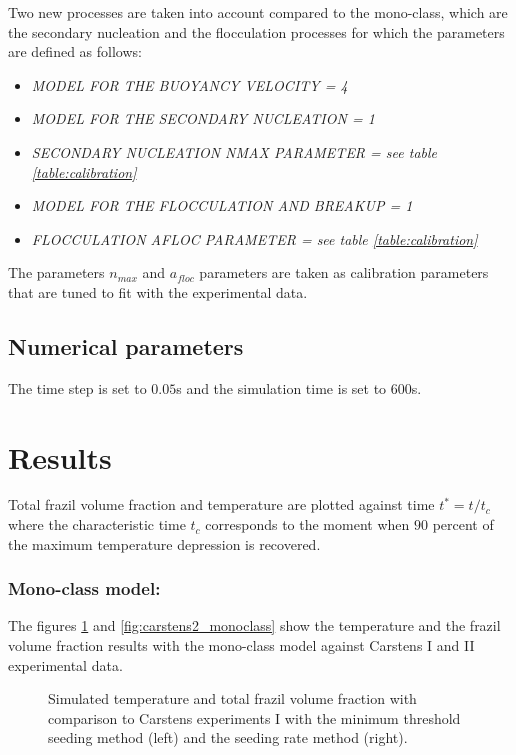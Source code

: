 Two new processes are taken into account compared to the mono-class, 
which are the secondary nucleation and the flocculation processes for which
the parameters are defined as follows:
\begin{itemize}
	\item\textit{MODEL FOR THE BUOYANCY VELOCITY = 4}
	\item\textit{MODEL FOR THE SECONDARY NUCLEATION = 1}
	\item\textit{SECONDARY NUCLEATION NMAX PARAMETER = see table \ref{table:calibration}}
	\item\textit{MODEL FOR THE FLOCCULATION AND BREAKUP = 1}
	\item\textit{FLOCCULATION AFLOC PARAMETER = see table \ref{table:calibration}}
\end{itemize}
The parameters $n_{max}$ and $a_{floc}$ parameters are taken as calibration parameters 
that are tuned to fit with the experimental data.


\subsection{Numerical parameters}

The time step is set to $0.05$s and the simulation time is set to $600$s.

\section{Results}

Total frazil volume fraction and temperature are plotted against time $t^*=t/t_c$ 
where the characteristic time $t_c$ corresponds to the
moment when $90$ percent of the maximum temperature depression is recovered.

\subsubsection{Mono-class model:}

The figures \ref{fig:carstens1_monoclass} and \ref{fig:carstens2_monoclass}
show the temperature and the frazil volume fraction results with the mono-class 
model against Carstens I and II experimental data.

\begin{figure}[H]
    \begin{center}
    \end{center}
    \caption{Simulated temperature and total frazil volume fraction with comparison to Carstens experiments I
             with the minimum threshold seeding method (left) and the seeding rate method (right).}
    \label{fig:carstens1_monoclass}
\end{figure}

